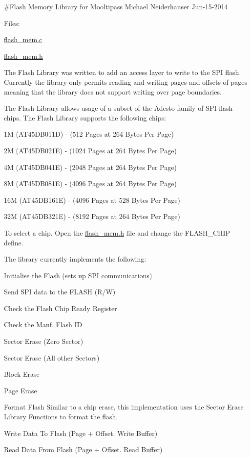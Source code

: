 \#\+Flash Memory Library for Mooltipass Michael Neiderhauser Jun-\/15-\/2014

Files\+:
\begin{DoxyItemize}
\item \hyperlink{flash__mem_8c}{flash\+\_\+mem.\+c}
\item \hyperlink{flash__mem_8h}{flash\+\_\+mem.\+h}
\end{DoxyItemize}

The Flash Library was written to add an access layer to write to the S\+PI flash. Currently the library only permits reading and writing pages and offsets of pages meaning that the library does not support writing over page boundaries.

The Flash Library allows usage of a subset of the Adesto family of S\+PI flash chips. The Flash Library supports the following chips\+:
\begin{DoxyItemize}
\item 1M (A\+T45\+D\+B011D) -\/ (512 Pages at 264 Bytes Per Page)
\item 2M (A\+T45\+D\+B021E) -\/ (1024 Pages at 264 Bytes Per Page)
\item 4M (A\+T45\+D\+B041E) -\/ (2048 Pages at 264 Bytes Per Page)
\item 8M (A\+T45\+D\+B081E) -\/ (4096 Pages at 264 Bytes Per Page)
\item 16M (A\+T45\+D\+B161E) -\/ (4096 Pages at 528 Bytes Per Page)
\item 32M (A\+T45\+D\+B321E) -\/ (8192 Pages at 264 Bytes Per Page)
\end{DoxyItemize}

To select a chip. Open the \hyperlink{flash__mem_8h}{flash\+\_\+mem.\+h} file and change the F\+L\+A\+S\+H\+\_\+\+C\+H\+IP define.

The library currently implements the following\+:
\begin{DoxyItemize}
\item Initialise the Flash (sets up S\+PI communications)
\item Send S\+PI data to the F\+L\+A\+SH (R/W)
\item Check the Flash Chip \textquotesingle{}Ready\textquotesingle{} Register
\item Check the Manf. Flash ID
\item Sector Erase (Zero Sector)
\item Sector Erase (All other Sectors)
\item Block Erase
\item Page Erase
\item Format Flash Similar to a chip erase, this implementation uses the Sector Erase Library Functions to format the flash.
\item Write Data To Flash (Page + Offset. Write Buffer)
\item Read Data From Flash (Page + Offset. Read Buffer)
\end{DoxyItemize}

